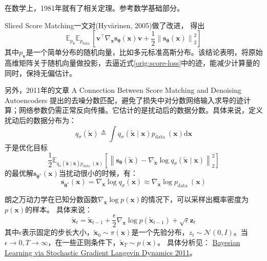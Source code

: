 在数学上，1981年就有了相关定理。参考数学基础部分。

Sliced Score Matching一文对(Hyvärinen, 2005)做了改进，
得出
\begin{equation}
\mathbb{E}_{p_{\mathbf{v}}} \mathbb{E}_{p_{\text {data }}}\left[\mathbf{v}^{\top} \nabla_{\mathbf{x}} \mathbf{s}_{\boldsymbol{\theta}}(\mathbf{x}) \mathbf{v}+\frac{1}{2}\left\|\mathbf{s}_{\boldsymbol{\theta}}(\mathbf{x})\right\|_2^2\right]
\end{equation}
其中$p_{\mathbf{v}}$是一个简单分布的随机向量，比如多元标准高斯分布。该结论表明，将原始高维矩阵关于随机向量做投影，去逼近式\eqref{orig:score-loss}中的迹，能减少计算量的同时，保持无偏估计。

另外，2011年的文章 A Connection Between Score Matching and Denoising Autoencoders 提出的去噪分数匹配，避免了损失中对分数网络输入求导的迹计算；网络参数仍需正常反向传播。它估计的是扰动后的数据分数。具体来说，定义扰动后的数据分布为：
\begin{equation}
q_\sigma(\tilde{\mathbf{x}}) \triangleq \int q_\sigma(\tilde{\mathbf{x}} \mid \mathbf{x}) p_{\text {data }}(\mathbf{x}) \mathrm{d} \mathbf{x}
\end{equation}
于是优化目标
\begin{equation}
\frac{1}{2} \mathbb{E}_{q_\sigma(\tilde{\mathbf{x}} \mid \mathbf{x}) p_{\text {data }}(\mathbf{x})}\left[\left\|\mathbf{s}_{\boldsymbol{\theta}}(\tilde{\mathbf{x}})-\nabla_{\tilde{\mathbf{x}}} \log q_\sigma(\tilde{\mathbf{x}} \mid \mathbf{x})\right\|_2^2\right]
\end{equation}
的最优解$\mathbf{s}_{\boldsymbol{\theta}^*}(\mathbf{x})$当扰动很小的时候，有：
\begin{equation}
\mathbf{s}_{\boldsymbol{\theta}^*}(\mathbf{x})=\nabla_{\mathbf{x}} \log q_\sigma(\mathbf{x}) \approx \nabla_{\mathbf{x}} \log p_{\text {data }}(\mathbf{x})
\end{equation}

朗之万动力学在已知分数函数$\nabla_{\mathbf{x}} \log p(\mathbf{x})$的情况下，可以采样出概率密度为$p(\mathbf{x})$的样本。
具体来说：
\begin{equation}
\label{orig:langevin}
\tilde{\mathbf{x}}_t=\tilde{\mathbf{x}}_{t-1}+\frac{\epsilon}{2} \nabla_{\mathbf{x}} \log p\left(\tilde{\mathbf{x}}_{t-1}\right)+\sqrt{\epsilon} \mathbf{z}_t
\end{equation}
其中$\epsilon$表示固定的步长大小，$\tilde{\mathbf{x}}_0 \sim \pi(\mathbf{x})$是一个先验分布，$z_t \sim \mathcal{N}(0, I)$。当$\epsilon \rightarrow 0, T \rightarrow \infty$，在一些正则条件下，$
\tilde{\mathbf{x}}_T \sim p(\mathbf{x})$。
具体分析见：
\href{https://www.stats.ox.ac.uk/~teh/research/compstats/WelTeh2011a.pdf}{Bayesian Learning via Stochastic Gradient Langevin Dynamics 2011}。

